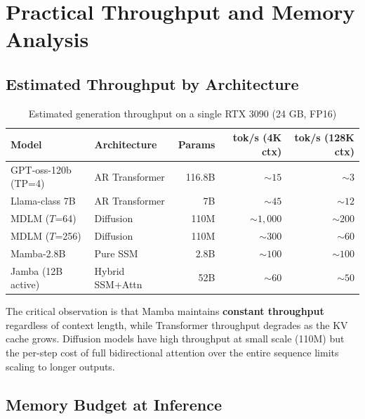 \documentclass[11pt,letterpaper]{article}
\begin{document}
\section{Practical Throughput and Memory Analysis}
\label{sec:practical}

\subsection{Estimated Throughput by Architecture}

\begin{table}[htbp]
\centering
\caption{Estimated generation throughput on a single RTX 3090 (24 GB, FP16)}
\label{tab:throughput}
\begin{tabular}{@{}llrrr@{}}
\toprule
\textbf{Model} & \textbf{Architecture} & \textbf{Params} & \textbf{tok/s (4K ctx)} & \textbf{tok/s (128K ctx)} \\
\midrule
GPT-oss-120b (TP=4) & AR Transformer & 116.8B & ${\sim}15$ & ${\sim}3$ \\
Llama-class 7B & AR Transformer & 7B & ${\sim}45$ & ${\sim}12$ \\
MDLM ($T$=64) & Diffusion & 110M & ${\sim}1{,}000$ & ${\sim}200$ \\
MDLM ($T$=256) & Diffusion & 110M & ${\sim}300$ & ${\sim}60$ \\
Mamba-2.8B & Pure SSM & 2.8B & ${\sim}100$ & ${\sim}100$ \\
Jamba (12B active) & Hybrid SSM+Attn & 52B & ${\sim}60$ & ${\sim}50$ \\
\bottomrule
\end{tabular}
\end{table}

The critical observation is that Mamba maintains \textbf{constant throughput} regardless of context length, while Transformer throughput degrades as the KV cache grows. Diffusion models have high throughput at small scale (110M) but the per-step cost of full bidirectional attention over the entire sequence limits scaling to longer outputs.

\subsection{Memory Budget at Inference}
\end{document}
